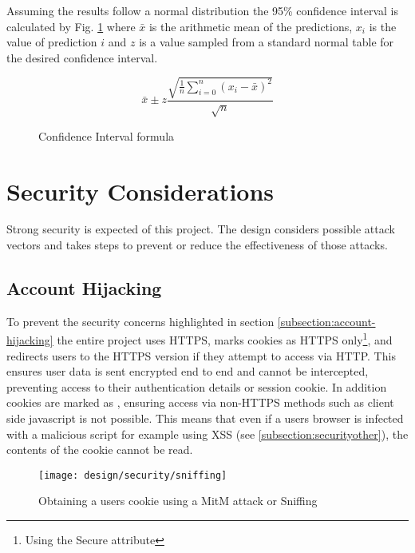 Assuming the results follow a normal distribution the 95\% confidence interval is calculated by Fig. \ref{fig:confidencelevel} where $\bar{x}$ is the arithmetic mean of the predictions, $x_i$ is the value of prediction $i$ and $z$ is a value sampled from a standard normal table for the desired confidence interval.

\begin{figure}[h]
    \centering
    \[
        \bar{x} \pm z \frac{
                        \sqrt{
                            \frac{1}{n}
                            \sum\limits_{i=0}^{n}{(x_i - \bar{x})^2}
                        }
                       }{\sqrt{n}}
    \]
    \caption[Confidence Interval formula]{Confidence Interval formula}
    \label{fig:confidencelevel}
\end{figure}

\section{Security Considerations} \label{section:security}
Strong security is expected of this project. The design considers possible attack vectors and takes steps to prevent or reduce the effectiveness of those attacks.

\subsection{Account Hijacking}
To prevent the security concerns highlighted in section \ref{subsection:account-hijacking} the entire project uses HTTPS, marks cookies as HTTPS only\footnote{Using the Secure attribute}, and redirects users to the HTTPS version if they attempt to access via HTTP. This ensures user data is sent encrypted end to end and cannot be intercepted, preventing access to their authentication details or session cookie.
%
In addition cookies are marked as , ensuring access via non-HTTPS methods such as client side javascript is not possible. This means that even if a users browser is infected with a malicious script for example using XSS (see \ref{subsection:securityother}), the contents of the cookie cannot be read.

\begin{figure}[h]
    \centering
    \texttt{[image: design/security/sniffing]}
    \caption[Obtaining a users cookie using a MitM attack or sniffing]{Obtaining a users cookie using a MitM attack or Sniffing \parencite{owasp2011sessionhihacking}}
    \label{fig:securitysniffing}
\end{figure}

